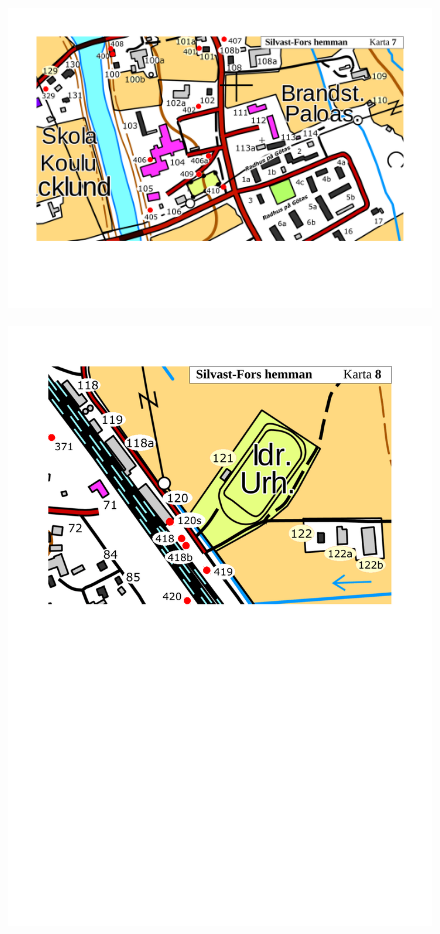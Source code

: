\begin{figure}[htbp]
  \centering
  \includegraphics[width=1\textwidth]{kartor/Karta7.pdf}
  \label{map:7}
\end{figure}

\begin{figure}[htbp]
  \centering
  \includegraphics[width=1\textwidth]{kartor/Karta8.pdf}
  \label{map:8}
\end{figure}

